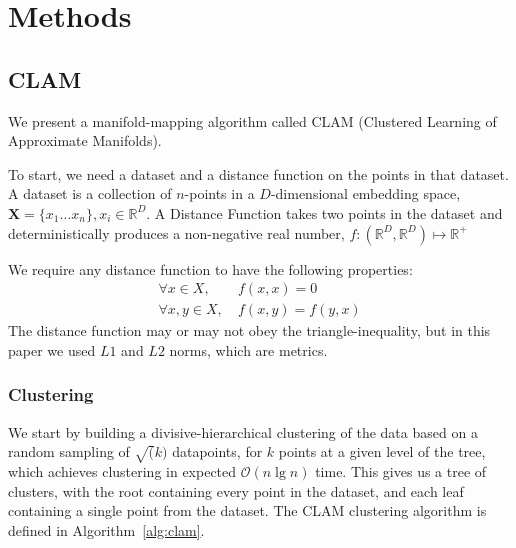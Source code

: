 \section{Methods}
\label{sec:methods}

\subsection{CLAM}
\label{subsec:methods:clam}

We present a manifold-mapping algorithm called CLAM (Clustered Learning of Approximate Manifolds).

To start, we need a dataset and a distance function on the points in that dataset.
A dataset is a collection of $n$-points in a $D$-dimensional embedding space, $\textbf{X} = \{x_1 \dots x_n\}, x_i \in \mathbb{R}^D$.
A Distance Function takes two points in the dataset and deterministically produces a non-negative real number, $f : (\mathbb{R}^D, \mathbb{R}^D) \mapsto \mathbb{R}^+$

We require any distance function to have the following properties:
\begin{align*}
    \forall x \in X,    & \ f(x, x) = 0       \\
    \forall x, y \in X, & \ f(x, y) = f(y, x)
\end{align*}
The distance function may or may not obey the triangle-inequality, but in this paper we used $L1$ and $L2$ norms, which are metrics.

\subsubsection{Clustering}\label{subsubsec:methods:clam:clustering}
We start by building a divisive-hierarchical clustering of the data based on a random sampling of $\sqrt(k)$ datapoints, for $k$ points at a given level of the tree, which achieves clustering in expected $\mathcal{O}(n \lg n)$ time.
This gives us a tree of clusters, with the root containing every point in the dataset, and each leaf containing a single point from the dataset.
The CLAM clustering algorithm is defined in Algorithm~\ref{alg:clam}.

